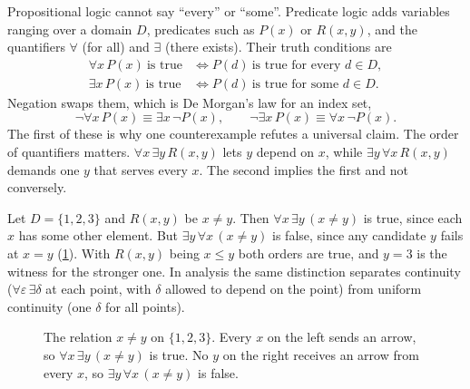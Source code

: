 Propositional logic cannot say ``every'' or ``some''. Predicate logic adds variables ranging over a domain $D$, predicates such as $P(x)$ or $R(x,y)$, and the quantifiers $\forall$ (for all) and $\exists$ (there exists). Their truth conditions are
\begin{equation}
\begin{aligned}
\forall x\,P(x)\ \text{is true}&\iff P(d)\ \text{is true for every } d\in D,\\
\exists x\,P(x)\ \text{is true}&\iff P(d)\ \text{is true for some } d\in D.
\end{aligned}
\label{eq:ch10:quant}
\end{equation}
Negation swaps them, which is De Morgan's law for an index set,
\begin{equation}
\neg\forall x\,P(x)\equiv\exists x\,\neg P(x),\qquad \neg\exists x\,P(x)\equiv\forall x\,\neg P(x).
\label{eq:ch10:negquant}
\end{equation}
The first of these is why one counterexample refutes a universal claim. The order of quantifiers matters. $\forall x\,\exists y\,R(x,y)$ lets $y$ depend on $x$, while $\exists y\,\forall x\,R(x,y)$ demands one $y$ that serves every $x$. The second implies the first and not conversely.

\begin{example}\label{ex:ch10:order}
Let $D=\{1,2,3\}$ and $R(x,y)$ be $x\neq y$. Then $\forall x\,\exists y\,(x\neq y)$ is true, since each $x$ has some other element. But $\exists y\,\forall x\,(x\neq y)$ is false, since any candidate $y$ fails at $x=y$ (\cref{fig:ch10:quant}). With $R(x,y)$ being $x\le y$ both orders are true, and $y=3$ is the witness for the stronger one. In analysis the same distinction separates continuity ($\forall\varepsilon\,\exists\delta$ at each point, with $\delta$ allowed to depend on the point) from uniform continuity (one $\delta$ for all points).
\end{example}

\begin{figure}[tbp]
\centering
{}
\caption{The relation $x\neq y$ on $\{1,2,3\}$. Every $x$ on the left sends an arrow, so $\forall x\,\exists y\,(x\neq y)$ is true. No $y$ on the right receives an arrow from every $x$, so $\exists y\,\forall x\,(x\neq y)$ is false.}
\label{fig:ch10:quant}
\end{figure}

